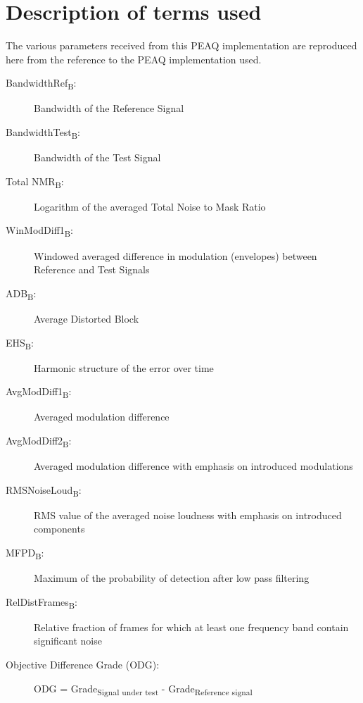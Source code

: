 \section{Description of terms used}
The various parameters received from this PEAQ implementation are reproduced here from the reference to the PEAQ implementation used\cite{Campeanu2005}.
\begin{description}
\item[BandwidthRef\textsubscript{B}:] Bandwidth of the Reference Signal
\item[BandwidthTest\textsubscript{B}:] Bandwidth of the Test Signal
\item[Total NMR\textsubscript{B}:] Logarithm of the averaged Total Noise to Mask Ratio
\item[WinModDiff1\textsubscript{B}:] Windowed averaged difference in modulation (envelopes) between Reference and Test Signals
\item[ADB\textsubscript{B}:] Average Distorted Block
\item[EHS\textsubscript{B}:] Harmonic structure of the error over time
\item[AvgModDiff1\textsubscript{B}:] Averaged modulation difference
\item[AvgModDiff2\textsubscript{B}:] Averaged modulation difference with emphasis on introduced modulations
\item[RMSNoiseLoud\textsubscript{B}:] RMS value of the averaged noise loudness with emphasis on introduced components
\item[MFPD\textsubscript{B}:] Maximum of the probability of detection after low pass filtering
\item[RelDistFrames\textsubscript{B}:] Relative fraction of frames for which at least one frequency band contain significant noise
\item[Objective Difference Grade (ODG):] ODG = Grade\textsubscript{Signal under test} - Grade\textsubscript{Reference signal}
\end{description}


